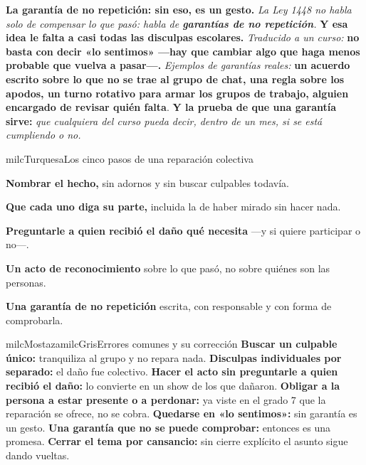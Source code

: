 \documentclass[11pt,letterpaper]{article}
\newcommand{\milcpaso}[3]{%
\Needspace{4\baselineskip}%
\begin{tcolorbox}[enhanced,colback=white,colframe=milcLinea,arc=1.5mm,boxrule=.9pt,
  left=14mm,right=4mm,top=3mm,bottom=3mm,before skip=4pt,after skip=4pt,
  fontupper=\RaggedRight,
  overlay={\node[anchor=north west,circle,fill=#2,text=white,inner sep=0pt,
    minimum size=7.4mm,font=\sffamily\bfseries\small]
    at ([xshift=3.6mm,yshift=-3.2mm]frame.north west) {#1};}]
#3
\end{tcolorbox}}
\begin{document}
\milcpaso{4}{milcTurquesa}{\textbf{La garantía de no repetición: sin eso, es un gesto.} \emph{La Ley 1448 no habla solo de compensar lo que pasó: habla de \textbf{garantías de no repetición}.} \textbf{Y esa idea le falta a casi todas las disculpas escolares.} \emph{Traducido a un curso:} \textbf{no basta con decir «lo sentimos» ---hay que cambiar algo que haga menos probable que vuelva a pasar---.} \emph{Ejemplos de garantías reales:} \textbf{un acuerdo escrito sobre lo que no se trae al grupo de chat, una regla sobre los apodos, un turno rotativo para armar los grupos de trabajo, alguien encargado de revisar quién falta}. \textbf{Y la prueba de que una garantía sirve:} \emph{que cualquiera del curso pueda decir, dentro de un mes, si se está cumpliendo o no.}}

\begin{drawbox}{milcTurquesa}{Los cinco pasos de una reparación colectiva}
\begin{pasoslista}
\item \textbf{Nombrar el hecho,} sin adornos y sin buscar culpables todavía.
\item \textbf{Que cada uno diga su parte,} incluida la de haber mirado sin hacer nada.
\item \textbf{Preguntarle a quien recibió el daño qué necesita} ---y si quiere participar o no---.
\item \textbf{Un acto de reconocimiento} sobre lo que pasó, no sobre quiénes son las personas.
\item \textbf{Una garantía de no repetición} escrita, con responsable y con forma de comprobarla.
\end{pasoslista}
\end{drawbox}

\begin{softbox}{milcMostaza}{milcGris}{Errores comunes y su corrección}
\textbf{Buscar un culpable único:} tranquiliza al grupo y no repara nada. \textbf{Disculpas individuales por separado:} el daño fue colectivo. \textbf{Hacer el acto sin preguntarle a quien recibió el daño:} lo convierte en un show de los que dañaron. \textbf{Obligar a la persona a estar presente o a perdonar:} ya viste en el grado 7 que la reparación se ofrece, no se cobra. \textbf{Quedarse en «lo sentimos»:} sin garantía es un gesto. \textbf{Una garantía que no se puede comprobar:} entonces es una promesa. \textbf{Cerrar el tema por cansancio:} sin cierre explícito el asunto sigue dando vueltas.
\end{softbox}
\end{document}
